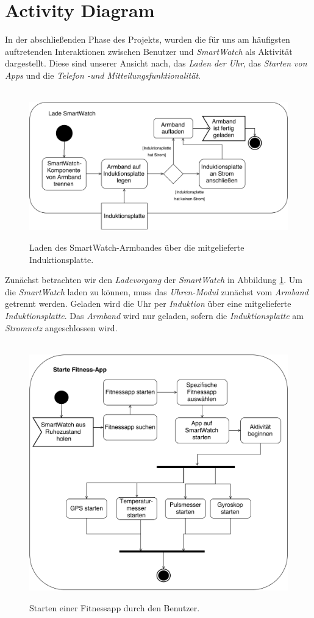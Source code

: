 \section{Activity Diagram}
In der abschließenden Phase des Projekts, wurden die für uns am häufigsten auftretenden Interaktionen zwischen Benutzer und \textit{SmartWatch} als Aktivität dargestellt. Diese sind unserer Ansicht nach, das \textit{Laden der Uhr}, das \textit{Starten von Apps} und die \textit{Telefon -und Mitteilungsfunktionalität}.\\
\begin{figure}[h]
\centering\
\includegraphics[width=\textwidth]{img/activityLaden}
\caption{Laden des SmartWatch-Armbandes über die mitgelieferte Induktionsplatte.}\label{fig:activityLaden}
\end{figure}
Zunächst betrachten wir den \textit{Ladevorgang} der \textit{SmartWatch} in Abbildung \ref{fig:activityLaden}.
Um die \textit{SmartWatch} laden zu können, muss das \textit{Uhren-Modul} zunächst vom \textit{Armband} getrennt werden. Geladen wird die Uhr per \textit{Induktion} über eine mitgelieferte \textit{Induktionsplatte}. Das \textit{Armband} wird nur geladen, sofern die \textit{Induktionsplatte} am \textit{Stromnetz} angeschlossen wird.\\
\begin{figure}[h]
\centering\
\includegraphics[width=\textwidth]{img/activityFitness}
\caption{Starten einer Fitnessapp durch den Benutzer.}\label{fig:activityFitness}
\end{figure}
